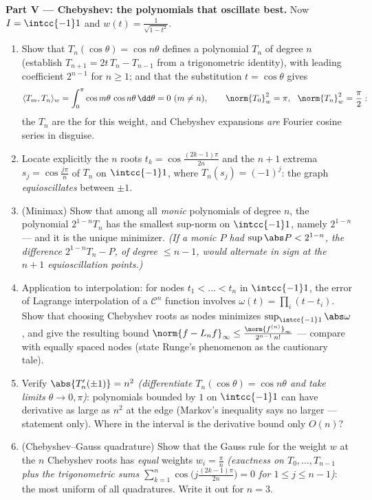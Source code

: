 \begin{problem}
\medskip
\noindent\textbf{Part V --- Chebyshev: the polynomials that
oscillate best.} Now $I = \intcc{-1}1$ and $w(t) =
\frac1{\sqrt{1 - t^2}}$.
\begin{enumerate}[resume]
  \item Show that $T_n(\cos\theta) = \cos n\theta$ defines a
        polynomial $T_n$ of degree $n$ (establish $T_{n+1} =
        2t\,T_n - T_{n-1}$ from a trigonometric identity),
        with leading coefficient $2^{n-1}$ for $n \geq 1$;
        and that the substitution $t = \cos\theta$ gives
        \[
        \langle T_m, T_n\rangle_w =
        \int_0^\pi\cos m\theta\,\cos n\theta\,\dd\theta
        = 0 \ (m \neq n), \qquad
        \norm{T_0}_w^2 = \pi,\ \ \norm{T_n}_w^2 = \frac\pi2 :
        \]
        the $T_n$ are the  for this
        weight, and Chebyshev expansions \emph{are} Fourier
        cosine series in disguise.
  \item Locate explicitly the $n$ roots $t_k =
        \cos\frac{(2k-1)\pi}{2n}$ and the $n + 1$ extrema
        $s_j = \cos\frac{j\pi}n$ of $T_n$ on $\intcc{-1}1$,
        where $T_n(s_j) = (-1)^j$: the graph
        \emph{equioscillates} between $\pm1$.
  \item (Minimax) Show that among all \emph{monic}
        polynomials of degree $n$, the polynomial
        $2^{1-n}T_n$ has the smallest sup-norm on
        $\intcc{-1}1$, namely $2^{1-n}$ --- and it is the
        unique minimizer. \emph{(If a monic $P$ had
        $\sup\abs P < 2^{1-n}$, the difference $2^{1-n}T_n -
        P$, of degree $\leq n-1$, would alternate in sign at
        the $n+1$ equioscillation points.)}
  \item Application to interpolation: for nodes $t_1 < \dots
        < t_n$ in $\intcc{-1}1$, the error of Lagrange
        interpolation of a $\mathcal C^n$ function involves
        $\omega(t) = \prod_i(t - t_i)$. Show that choosing
        Chebyshev roots as nodes minimizes
        $\sup_{\intcc{-1}1}\abs\omega$, and give the
        resulting bound $\norm{f -
        L_nf}_\infty \leq \frac{\norm{f^{(n)}}_\infty}
        {2^{n-1}\,n!}$ --- compare with equally spaced nodes
        (state Runge's phenomenon as the cautionary tale).
  \item Verify $\abs{T_n'(\pm1)} = n^2$ \emph{(differentiate
        $T_n(\cos\theta) = \cos n\theta$ and take limits
        $\theta \to 0, \pi$)}: polynomials bounded by $1$ on
        $\intcc{-1}1$ can have derivative as large as $n^2$
        at the edge (Markov's inequality says no larger ---
        statement only). Where in the interval is the
        derivative bound only $O(n)$?
  \item (Chebyshev--Gauss quadrature) Show that the Gauss
        rule for the weight $w$ at the $n$ Chebyshev roots
        has \emph{equal} weights $w_i = \frac\pi n$
        \emph{(exactness on $T_0, \dots, T_{n-1}$ plus the
        trigonometric sums
        $\sum_{k=1}^n\cos\bigl(j\tfrac{(2k-1)\pi}{2n}\bigr) =
        0$ for $1 \leq j \leq n - 1$)}: the most uniform of
        all quadratures. Write it out for $n = 3$.
\end{enumerate}


\end{problem}

